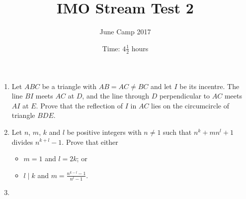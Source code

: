 \documentclass{article}
\title{IMO Stream Test 2}
\author{June Camp 2017}
\date{Time: $4\frac{1}{2}$ hours}
\begin{document}
 \maketitle

\begin{enumerate}

\item %
	Let $ABC$ be a triangle with $AB = AC \neq BC$ and let $I$ be its incentre. The line $BI$ meets $AC$ at $D$, and the line through $D$ perpendicular to $AC$ meets $AI$ at $E$. Prove that the reflection of $I$ in $AC$ lies on the circumcircle of triangle $BDE$.

\item %
	Let $n$, $m$, $k$ and $l$ be positive integers with $n \neq 1$ such that $n^k +m n^l +1$ divides $n^{k+l}-1$. Prove that either
	\begin{itemize}
		\item $m = 1$ and $l = 2k$; or
		\item $l \mid k$ and $m = \frac{n^{k-l}-1}{n^l-1}$.
	\end{itemize}

\item %
		

\end{enumerate}
\end{document}
